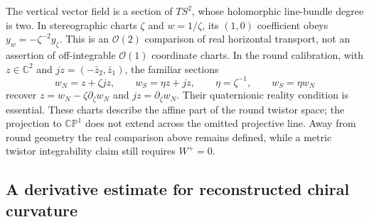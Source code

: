 \documentclass[11pt]{article}
\numberwithin{equation}{section}
\theoremstyle{definition}
\theoremstyle{remark}
\newcommand{\CP}{\mathbb{CP}}
\begin{document}
The vertical vector field is a section of $TS^2$, whose holomorphic
line-bundle degree is two. In stereographic charts $\zeta$ and
$w=1/\zeta$, its $(1,0)$ coefficient obeys
$y_w=-\zeta^{-2}y_\zeta$. This is an $\mathcal O(2)$ comparison of
real horizontal transport, not an assertion of off-integrable
$\mathcal O(1)$ coordinate charts. In the round calibration, with
$z\in\mathbb C^2$ and $jz=(-\bar z_2,\bar z_1)$, the familiar sections
\[
 w_N=z+\zeta jz,\qquad w_S=\eta z+jz,\qquad
 \eta=\zeta^{-1},\qquad w_S=\eta w_N
\]
recover $z=w_N-\zeta\partial_\zeta w_N$ and
$jz=\partial_\zeta w_N$. Their quaternionic reality condition is essential.
These charts describe the affine part of the round twistor space;
the projection to $\CP^1$ does not extend across the omitted projective
line. Away from round geometry the real comparison above remains
defined, while a metric twistor integrability claim still requires $W^+=0$.

\subsection{A derivative estimate for reconstructed chiral curvature}
\label{subsec:transport-curvature}
\end{document}
